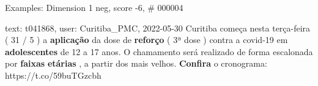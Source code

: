 \begin{frame}{Examples: Dimension 1 neg, score -6, \# 000004}
\footnotesize
\begin{alertblock}{text: t041868, user: Curitiba\_PMC, 2022-05-30}
Curitiba começa nesta terça-feira ( 31 / 5 ) a \textbf{aplicação} da dose de 
\textbf{reforço} ( 3ª dose ) contra a covid-19 em \textbf{adolescentes} de 12 a 
17 anos. O chamamento será realizado de forma escalonada por \textbf{faixas} 
\textbf{etárias} , a partir dos mais velhos. \textbf{Confira} o cronograma: 
https://t.co/59buTGzcbh 
\end{alertblock}
\end{frame}
